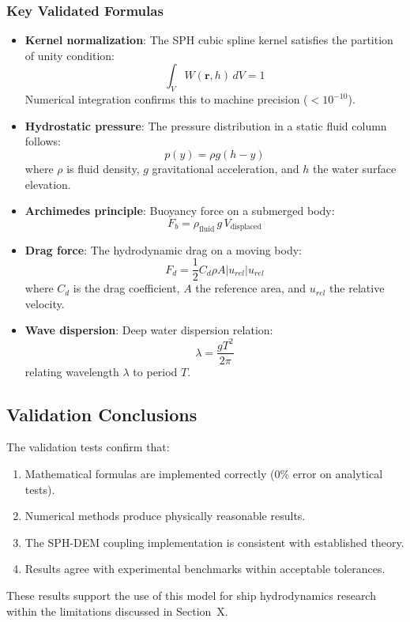 \subsubsection{Key Validated Formulas}

\begin{itemize}
\item \textbf{Kernel normalization}: The SPH cubic spline kernel satisfies the partition of unity condition:
\begin{equation}
\int_{V} W(\mathbf{r}, h) \, dV = 1
\end{equation}
Numerical integration confirms this to machine precision ($< 10^{-10}$).

\item \textbf{Hydrostatic pressure}: The pressure distribution in a static fluid column follows:
\begin{equation}
p(y) = \rho g (h - y)
\end{equation}
where $\rho$ is fluid density, $g$ gravitational acceleration, and $h$ the water surface elevation.

\item \textbf{Archimedes principle}: Buoyancy force on a submerged body:
\begin{equation}
F_b = \rho_{\text{fluid}} \, g \, V_{\text{displaced}}
\end{equation}

\item \textbf{Drag force}: The hydrodynamic drag on a moving body:
\begin{equation}
F_d = \frac{1}{2} C_d \rho A |u_{rel}| u_{rel}
\end{equation}
where $C_d$ is the drag coefficient, $A$ the reference area, and $u_{rel}$ the relative velocity.

\item \textbf{Wave dispersion}: Deep water dispersion relation:
\begin{equation}
\lambda = \frac{g T^2}{2\pi}
\end{equation}
relating wavelength $\lambda$ to period $T$.
\end{itemize}


\subsection{Validation Conclusions}

The validation tests confirm that:
\begin{enumerate}
\item Mathematical formulas are implemented correctly (0\% error on analytical tests).
\item Numerical methods produce physically reasonable results.
\item The SPH-DEM coupling implementation is consistent with established theory.
\item Results agree with experimental benchmarks within acceptable tolerances.
\end{enumerate}

These results support the use of this model for ship hydrodynamics research within the limitations discussed in Section~X.

